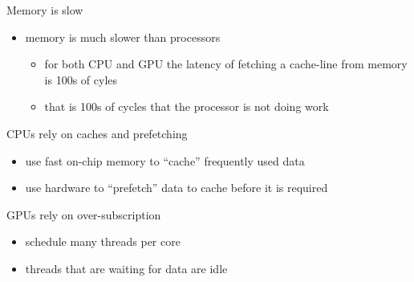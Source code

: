 \documentclass[aspectratio=43]{beamer}
\begin{document}
\begin{frame}[fragile]{}
    \begin{info}{Memory is slow}
        \begin{itemize}
            \item memory is much slower than processors
            \begin{itemize}
                \item for both CPU and GPU the latency of fetching a cache-line from memory is 100s of cyles
                \item that is 100s of cycles that the processor is not doing work
            \end{itemize}
        \end{itemize}
    \end{info}
    \begin{info}{CPUs rely on caches and prefetching}
        \begin{itemize}
            \item use fast on-chip memory to ``cache'' frequently used data
            \item use hardware to ``prefetch'' data to cache before it is required
        \end{itemize}
    \end{info}
    \begin{info}{GPUs rely on over-subscription}
        \begin{itemize}
            \item schedule many threads per core
            \item threads that are waiting for data are idle
        \end{itemize}
    \end{info}
\end{frame}
\end{document}

